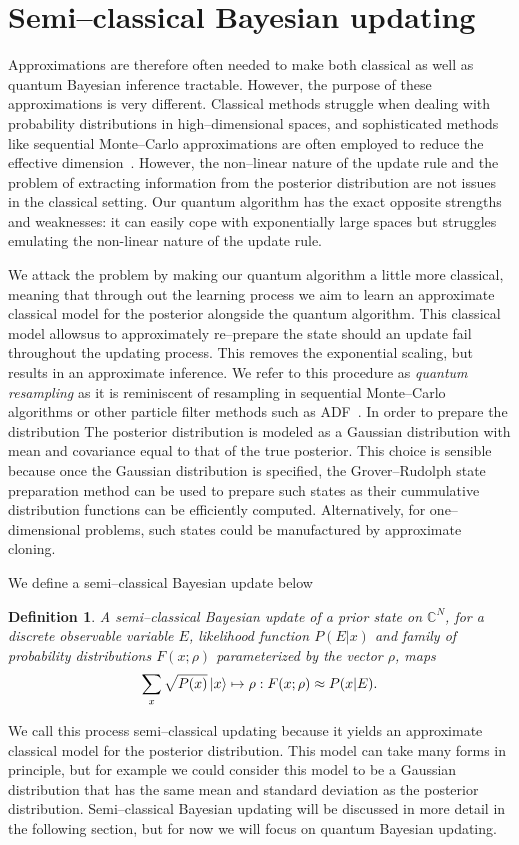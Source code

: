 \documentclass[aps,amsmath,onecolumn,amssymb]{revtex4}
\newtheorem{definition}{Definition}
\begin{document}
\section{Semi--classical Bayesian updating}
Approximations are therefore often needed to make both classical as well as quantum Bayesian inference tractable.  However, the purpose of these approximations is very different.  Classical methods struggle when dealing with probability distributions in high--dimensional spaces, and sophisticated methods like sequential Monte--Carlo approximations are often employed to reduce the effective dimension~\cite{liu_combined_2001,minka2001expectation,van2000unscented}.  However, the non--linear nature of the update rule and the problem of extracting information from the posterior distribution are not issues in the classical setting.  Our quantum algorithm has the exact opposite strengths and weaknesses: it can easily cope with exponentially large spaces but struggles emulating the non-linear nature of the update rule.

We attack the problem by making our quantum algorithm a little more classical, meaning that through out the learning process we aim to learn an approximate classical model for the posterior alongside the quantum algorithm.  This classical model allowsus to approximately re--prepare the state should an update fail throughout the updating process.  This removes the exponential scaling, but results in an approximate inference.  We refer to this procedure as \emph{quantum resampling} as it is reminiscent of resampling in sequential Monte--Carlo algorithms or other particle filter methods such as ADF~\cite{minka2001expectation}.  In order to prepare the distribution
The posterior distribution is modeled as a Gaussian distribution with mean and covariance equal to that of the true posterior.  This choice is sensible because once the Gaussian distribution is specified, the Grover--Rudolph state preparation method can be used to prepare such states as their cummulative distribution functions can be efficiently computed.
Alternatively, for one--dimensional problems, such states could be manufactured by approximate cloning.

We define a semi--classical Bayesian update below 
\begin{definition}
A semi--classical Bayesian update of a prior state on $\mathbb{C}^N$, for a discrete observable variable $E$, likelihood function $P(E|x)$ and family of probability distributions $F(x;\rho)$ parameterized by the vector $\rho$, maps 
$$\sum_x \sqrt{P(x)} \left|x\right\rangle\mapsto \rho: F(x;\rho) \approx P(x|E). $$\label{def:semi}
\end{definition}
We call this process semi--classical updating because it yields an approximate classical model for the posterior distribution.  This model can take many forms in principle, but for example we could consider this model to be a Gaussian distribution that has the same mean and standard deviation as the posterior distribution.
Semi--classical Bayesian updating will be discussed in more detail in the following section, but for now we will focus on quantum Bayesian updating.
\end{document}
